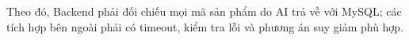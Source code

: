Theo đó, Backend phải đối chiếu mọi mã sản phẩm do AI trả về với MySQL; các tích hợp bên ngoài phải có timeout, kiểm tra lỗi và phương án suy giảm phù hợp.





